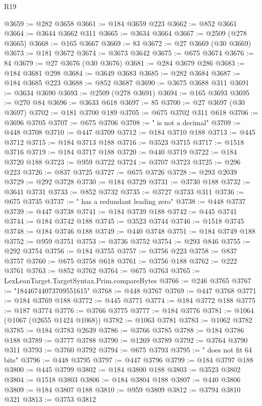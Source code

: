 \begin{lexlean}{R19}
\begin{coremodule}
@3659 := @282 @3658
@3661 := @184 @3659 @223
@3662 := @852 @3661
@3664 := @3644 @3662 @311
@3665 := @3634 @3664
@3667 := @2509 (@278 @3665)
@3668 := @165 @3667
@3669 := 83
@3672 := @27 @3669 (@30 @3669)
@3673 := @181 @3672
@3674 := @3673 @3642
@3675 := @675 @3674
@3676 := 84
@3679 := @27 @3676 (@30 @3676)
@3681 := @284 @3679 @286
@3683 := @184 @3681 @298
@3684 := @3649 @3683
@3685 := @282 @3684
@3687 := @184 @3685 @223
@3688 := @852 @3687
@3690 := @3675 @3688 @311
@3691 := @3634 @3690
@3693 := @2509 (@278 @3691)
@3694 := @165 @3693
@3695 := @270 @84
@3696 := @3633 @618
@3697 := 85
@3700 := @27 @3697 (@30 @3697)
@3702 := @181 @3700 @189
@3705 := @675 @3702 @311 @618
@3706 := @3696 @3705
@3707 := @675 @3706
@3708 := " is not a decimal"
@3709 := @448 @3708
@3710 := @447 @3709
@3712 := @184 @3710 @188
@3713 := @445 @3712
@3715 := @184 @3713 @188
@3716 := @3523 @3715
@3717 := @1518 @3716
@3719 := @184 @3717 @188
@3720 := @440 @3719
@3722 := @184 @3720 @188
@3723 := @959 @3722
@3724 := @3707 @3723
@3725 := @296 @223
@3726 := @837 @3725
@3727 := @675 @3726
@3728 := @293 @2039
@3729 := @292 @3728
@3730 := @184 @3729
@3731 := @3730 @188
@3732 := @3641 @3731
@3733 := @852 @3732
@3735 := @3727 @3733 @311
@3736 := @675 @3735
@3737 := " has a redundant leading zero"
@3738 := @448 @3737
@3739 := @447 @3738
@3741 := @184 @3739 @188
@3742 := @445 @3741
@3744 := @184 @3742 @188
@3745 := @3523 @3744
@3746 := @1518 @3745
@3748 := @184 @3746 @188
@3749 := @440 @3748
@3751 := @184 @3749 @188
@3752 := @959 @3751
@3753 := @3736 @3752
@3754 := @293 @846
@3755 := @292 @3754
@3756 := @184 @3755
@3757 := @3756 @223
@3758 := @837 @3757
@3760 := @675 @3758 @618
@3761 := @3756 @188
@3762 := @222 @3761
@3763 := @852 @3762
@3764 := @675 @3763
@3765 := LexLeanTarget.TargetSyntax.Prim.compareBytes
@3766 := @246 @3765
@3767 := "18446744073709551615"
@3768 := @448 @3767
@3769 := @447 @3768
@3771 := @184 @3769 @188
@3772 := @445 @3771
@3774 := @184 @3772 @188
@3775 := @187 @3774
@3776 := @3766 @3775
@3777 := @184 @3776
@3781 := @1064 (@1067 (@2655 @1424 @1068))
@3782 := @1063 @3781
@3783 := @1062 @3782
@3785 := @184 @3783 @2639
@3786 := @3766 @3785
@3788 := @184 @3786 @188
@3789 := @3777 @3788
@3790 := @1269 @3789
@3792 := @3764 @3790 @311
@3793 := @3760 @3792
@3794 := @675 @3793
@3795 := " does not fit 64 bits"
@3796 := @448 @3795
@3797 := @447 @3796
@3799 := @184 @3797 @188
@3800 := @445 @3799
@3802 := @184 @3800 @188
@3803 := @3523 @3802
@3804 := @1518 @3803
@3806 := @184 @3804 @188
@3807 := @440 @3806
@3809 := @184 @3807 @188
@3810 := @959 @3809
@3812 := @3794 @3810 @321
@3813 := @3753 @3812

\end{coremodule}
\end{lexlean}
